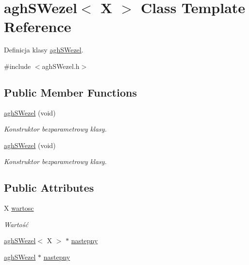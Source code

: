 \hypertarget{classaghSWezel}{\section{agh\-S\-Wezel$<$ \-X $>$ \-Class \-Template \-Reference}
\label{classaghSWezel}
}


\-Definicja klasy \hyperlink{classaghSWezel}{agh\-S\-Wezel}.  




{\ttfamily \#include $<$agh\-S\-Wezel.\-h$>$}

\subsection*{\-Public \-Member \-Functions}
\begin{DoxyCompactItemize}
\item 
\hypertarget{classaghSWezel_a321199f62fcad46f1b40361c570ff8d9}{\hyperlink{classaghSWezel_a321199f62fcad46f1b40361c570ff8d9}{agh\-S\-Wezel} (void)}\label{classaghSWezel_a321199f62fcad46f1b40361c570ff8d9}

\begin{DoxyCompactList}\small\item\em \-Konstruktor bezparametrowy klasy. \end{DoxyCompactList}\item 
\hypertarget{classaghSWezel_a321199f62fcad46f1b40361c570ff8d9}{\hyperlink{classaghSWezel_a321199f62fcad46f1b40361c570ff8d9}{agh\-S\-Wezel} (void)}\label{classaghSWezel_a321199f62fcad46f1b40361c570ff8d9}

\begin{DoxyCompactList}\small\item\em \-Konstruktor bezparametrowy klasy. \end{DoxyCompactList}\end{DoxyCompactItemize}
\subsection*{\-Public \-Attributes}
\begin{DoxyCompactItemize}
\item 
\hypertarget{classaghSWezel_a0cb908be60fdc804ac0a561e6d8e4e35}{\-X \hyperlink{classaghSWezel_a0cb908be60fdc804ac0a561e6d8e4e35}{wartosc}}\label{classaghSWezel_a0cb908be60fdc804ac0a561e6d8e4e35}

\begin{DoxyCompactList}\small\item\em \-Wartość \end{DoxyCompactList}\item 
\hyperlink{classaghSWezel}{agh\-S\-Wezel}$<$ \-X $>$ $\ast$ \hyperlink{classaghSWezel_a1f5c34d8cfbec7486e76bcc4f5aa38db}{nastepny}
\item 
\hyperlink{classaghSWezel}{agh\-S\-Wezel} $\ast$ \hyperlink{classaghSWezel_a5a6e94ea5d2e10a00be0cbf229f0d999}{nastepny}
\end{DoxyCompactItemize}


